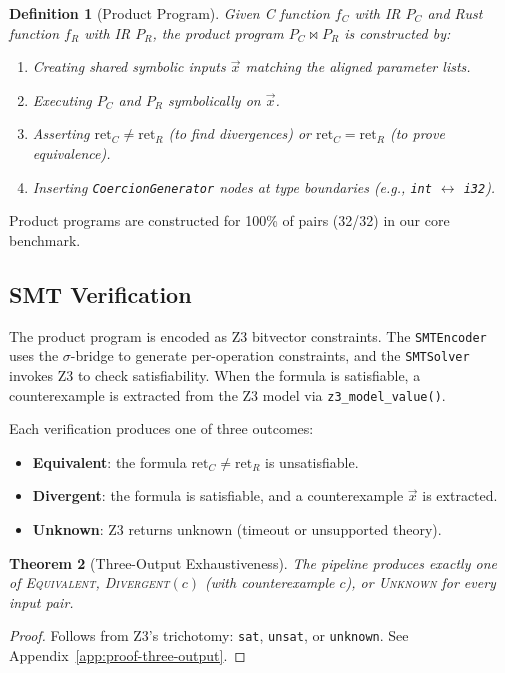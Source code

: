 \documentclass[11pt,a4paper]{article}
\newtheorem{theorem}{Theorem}
\newtheorem{definition}[theorem]{Definition}
\begin{document}
\begin{definition}[Product Program]
Given C function $f_C$ with IR $P_C$ and Rust function $f_R$ with
IR $P_R$, the product program $P_C \bowtie P_R$ is constructed by:
\begin{enumerate}
  \item Creating shared symbolic inputs $\vec{x}$ matching the aligned
    parameter lists.
  \item Executing $P_C$ and $P_R$ symbolically on $\vec{x}$.
  \item Asserting $\text{ret}_C \neq \text{ret}_R$ (to find divergences)
    or $\text{ret}_C = \text{ret}_R$ (to prove equivalence).
  \item Inserting \texttt{CoercionGenerator} nodes at type boundaries
    (e.g., \texttt{int} $\leftrightarrow$ \texttt{i32}).
\end{enumerate}
\end{definition}

Product programs are constructed for 100\% of pairs (32/32) in our
core benchmark.

\subsection{SMT Verification}\label{sec:smt}

The product program is encoded as Z3 bitvector constraints.  The
\texttt{SMTEncoder} uses the $\sigma$-bridge to generate per-operation
constraints, and the \texttt{SMTSolver} invokes Z3 to check
satisfiability.  When the formula is satisfiable, a counterexample is
extracted from the Z3 model via \texttt{z3\_model\_value()}.

Each verification produces one of three outcomes:
\begin{itemize}
  \item \textbf{Equivalent}: the formula
    $\text{ret}_C \neq \text{ret}_R$ is unsatisfiable.
  \item \textbf{Divergent}: the formula is satisfiable, and a
    counterexample $\vec{x}$ is extracted.
  \item \textbf{Unknown}: Z3 returns unknown (timeout or unsupported theory).
\end{itemize}

\begin{theorem}[Three-Output Exhaustiveness]\label{thm:three-output}
The pipeline produces exactly one of \textsc{Equivalent},
\textsc{Divergent}$(c)$ (with counterexample $c$), or \textsc{Unknown}
for every input pair.
\end{theorem}
\begin{proof}
Follows from Z3's trichotomy: \texttt{sat}, \texttt{unsat}, or
\texttt{unknown}.  See Appendix~\ref{app:proof-three-output}.
\end{proof}
\end{document}
